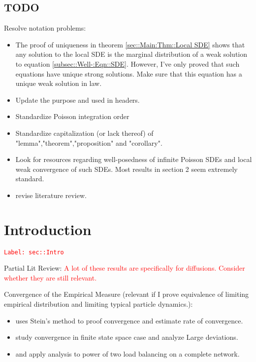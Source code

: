 \documentclass[12pt]{article}
\newcommand{\tr}{\textcolor{red}}
\newcommand{\labe}[1]{\tr{\texttt{Label: #1}}}
\begin{document}
\subsection*{TODO}

Resolve notation problems:

\begin{itemize}
\item The proof of uniqueness in theorem \ref{sec::Main:Thm::Local SDE} shows that any solution to the local SDE is the marginal distribution of a weak solution to equation \eqref{subsec::Well-:Eqn::SDE}. However, I've only proved that such equations have unique strong solutions. Make sure that this equation has a unique weak solution in law.

\item Update the purpose and used in headers.

\item Standardize Poisson integration order

\item Standardize capitalization (or lack thereof) of "lemma","theorem","proposition" and "corollary".

\item Look for resources regarding well-posedness of infinite Poisson SDEs and local weak convergence of such SDEs. Most results in section 2 seem extremely standard.

\item revise literature review.
\end{itemize}

\section{Introduction}
\label{sec::Intro}\labe{sec::Intro}

Partial Lit Review: \tr{A lot of these results are specifically for diffusions. Consider whether they are still relevant.}

Convergence of the Empirical Measure (relevant if I prove equivalence of limiting empirical distribution and limiting typical particle dynamics.):

\begin{itemize}
\item \cite{Yin15} uses Stein's method to proof convergence and estimate rate of convergence.

\item \cite{DupRamWu16} study convergence in finite state space case and analyze Large deviations.

\item \cite{VveDobKar96} and \cite{Mit01} apply analysis to power of two load balancing on a complete network. 
\end{itemize}
\end{document}
